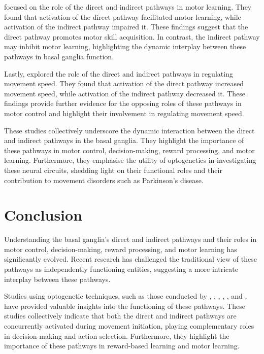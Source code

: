 \documentclass[10pt]{article}
\begin{document}
\begin{sloppypar}
  \cite{hilt_evidence_2016} focused on the role of the direct and indirect pathways in motor learning. They found that activation of the direct pathway facilitated motor learning, while activation of the indirect pathway impaired it. These findings suggest that the direct pathway promotes motor skill acquisition. In contrast, the indirect pathway may inhibit motor learning, highlighting the dynamic interplay between these pathways in basal ganglia function.

  Lastly, \cite{wang_direct_2015} explored the role of the direct and indirect pathways in regulating movement speed. They found that activation of the direct pathway increased movement speed, while activation of the indirect pathway decreased it. These findings provide further evidence for the opposing roles of these pathways in motor control and highlight their involvement in regulating movement speed.

  These studies collectively underscore the dynamic interaction between the direct and indirect pathways in the basal ganglia. They highlight the importance of these pathways in motor control, decision-making, reward processing, and motor learning. Furthermore, they emphasise the utility of optogenetics in investigating these neural circuits, shedding light on their functional roles and their contribution to movement disorders such as Parkinson’s disease.

  \section{Conclusion}
  \label{sec:conclusion}

  Understanding the basal ganglia’s direct and indirect pathways and their roles in motor control, decision-making, reward processing, and motor learning has significantly evolved. Recent research has challenged the traditional view of these pathways as independently functioning entities, suggesting a more intricate interplay between these pathways.

  Studies using optogenetic techniques, such as those conducted by \cite{cui_concurrent_2013}, \cite{kravitz_regulation_2010}, \cite{yttri_opponent_2016}, \cite{guillaumin_optogenetic_2020}, \cite{hilt_evidence_2016}, and \cite{wang_direct_2015}, have provided valuable insights into the functioning of these pathways. These studies collectively indicate that both the direct and indirect pathways are concurrently activated during movement initiation, playing complementary roles in decision-making and action selection. Furthermore, they highlight the importance of these pathways in reward-based learning and motor learning.


\end{sloppypar}
\end{document}
